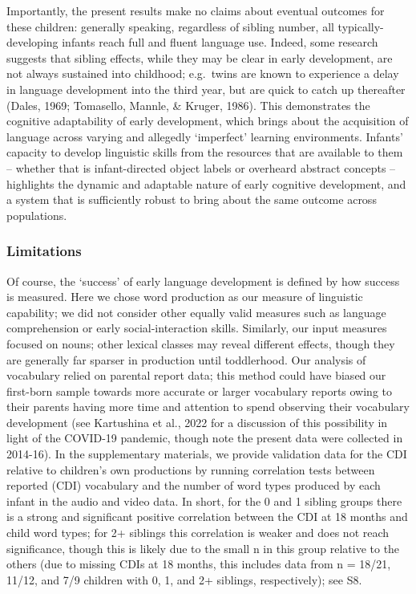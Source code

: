 \documentclass[
  man,mask,floatsintext]{apa6}
\begin{document}
Importantly, the present results make no claims about eventual outcomes for these children: generally speaking, regardless of sibling number, all typically-developing infants reach full and fluent language use. Indeed, some research suggests that sibling effects, while they may be clear in early development, are not always sustained into childhood; e.g.~twins are known to experience a delay in language development into the third year, but are quick to catch up thereafter (Dales, 1969; Tomasello, Mannle, \& Kruger, 1986). This demonstrates the cognitive adaptability of early development, which brings about the acquisition of language across varying and allegedly `imperfect' learning environments. Infants' capacity to develop linguistic skills from the resources that are available to them -- whether that is infant-directed object labels or overheard abstract concepts -- highlights the dynamic and adaptable nature of early cognitive development, and a system that is sufficiently robust to bring about the same outcome across populations.

\hypertarget{limitations}{%
\subsubsection{Limitations}\label{limitations}}

Of course, the `success' of early language development is defined by how success is measured. Here we chose word production as our measure of linguistic capability; we did not consider other equally valid measures such as language comprehension or early social-interaction skills. Similarly, our input measures focused on nouns; other lexical classes may reveal different effects, though they are generally far sparser in production until toddlerhood. Our analysis of vocabulary relied on parental report data; this method could have biased our first-born sample towards more accurate or larger vocabulary reports owing to their parents having more time and attention to spend observing their vocabulary development (see Kartushina et al., 2022 for a discussion of this possibility in light of the COVID-19 pandemic, though note the present data were collected in 2014-16). In the supplementary materials, we provide validation data for the CDI relative to children's own productions by running correlation tests between reported (CDI) vocabulary and the number of word types produced by each infant in the audio and video data. In short, for the 0 and 1 sibling groups there is a strong and significant positive correlation between the CDI at 18 months and child word types; for 2+ siblings this correlation is weaker and does not reach significance, though this is likely due to the small n in this group relative to the others (due to missing CDIs at 18 months, this includes data from n = 18/21, 11/12, and 7/9 children with 0, 1, and 2+ siblings, respectively); see S8.
\end{document}

